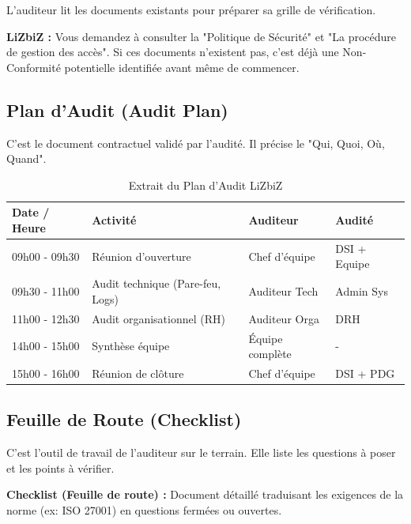 L'auditeur lit les documents existants pour préparer sa grille de vérification.

\begin{boxlizbiz}
\textbf{LiZbiZ :} Vous demandez à consulter la "Politique de Sécurité" et "La procédure de gestion des accès". Si ces documents n'existent pas, c'est déjà une Non-Conformité potentielle identifiée avant même de commencer.
\end{boxlizbiz}

\subsection{Plan d'Audit (Audit Plan)}

C'est le document contractuel validé par l'audité. Il précise le "Qui, Quoi, Où, Quand".

\begin{table}[htbp]
\centering
\small
\begin{tabular}{|p{3cm}|p{3cm}|p{3cm}|p{3cm}|}
    \hline
    \textbf{Date / Heure} & \textbf{Activité} & \textbf{Auditeur} & \textbf{Audité} \\
    \hline
    09h00 - 09h30 & Réunion d'ouverture & Chef d'équipe & DSI + Equipe \\
    \hline
    09h30 - 11h00 & Audit technique (Pare-feu, Logs) & Auditeur Tech & Admin Sys \\
    \hline
    11h00 - 12h30 & Audit organisationnel (RH) & Auditeur Orga & DRH \\
    \hline
    14h00 - 15h00 & Synthèse équipe & Équipe complète & - \\
    \hline
    15h00 - 16h00 & Réunion de clôture & Chef d'équipe & DSI + PDG \\
    \hline
\end{tabular}
\caption{Extrait du Plan d'Audit LiZbiZ}
\end{table}

\subsection{Feuille de Route (Checklist)}

C'est l'outil de travail de l'auditeur sur le terrain. Elle liste les questions à poser et les points à vérifier.

\begin{boxdef}
\textbf{Checklist (Feuille de route) :} Document détaillé traduisant les exigences de la norme (ex: ISO 27001) en questions fermées ou ouvertes.
\end{boxdef}

